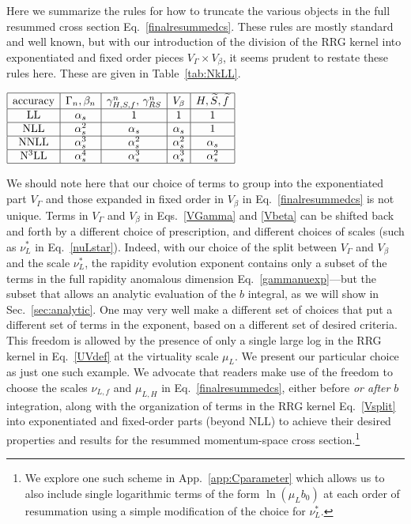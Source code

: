 \documentclass[a4,letterpaper,11pt]{article}
\newcommand{\nkll}{N$^k$LL\ }
\newcommand{\nkllprime}{N$^k$LL$'$\ }
\newcommand{\as}{\alpha_s}
\newcommand{\wt}{\widetilde}
\newcommand{\eq}[1]{Eq.~\eqref{#1}}
\newcommand{\eqs}[2]{Eqs.~\eqref{#1} and \eqref{#2}}
\renewcommand{\sec}[1]{Sec.~\ref{sec:#1}}
\newcommand{\appx}[1]{App.~\ref{app:#1}}
\newcommand{\tab}[1]{Table~\ref{tab:#1}}
\begin{document}
Here we summarize the rules for how to truncate the various objects in the full resummed cross section \eq{finalresummedcs}. These rules are mostly standard and well known, but with our introduction of the division of the RRG kernel into exponentiated and fixed order pieces $V_\Gamma \times V_\beta$, it seems prudent to restate these rules here. These are given in \tab{NkLL}.
\begin{table}[t]
\begin{center}
$
\begin{array}{ | c | c | c | c | c | c |}
\hline
\text{accuracy} & \Gamma_n,\beta_n & \gamma_{H,S,f}^n ,\, \gamma_{RS}^n & V_\beta &  H,\wt S,\wt f \\  \hline
\text{LL} & \as & 1 &  1 & 1  \\ \hline
\text{NLL} & \as^2 & \as  & \as & 1  \\ \hline
\text{NNLL} & \as^3 & \as^2  & \as^2 & \as \\ \hline
\text{N$^3$LL} & \as^4 & \as^3  & \as^3 & \as^2 \\ \hline 
\end{array}
$
\end{center}
\vspace{-1em}
\caption{Order of anomalous dimensions, beta function, and fixed-order functions (hard, soft, TMDPDF, and $V_\beta$ in \eq{VGammaVbeta}) required to achieve \nkll and \nkllprime accuracy in the resummed cross section \eq{finalresummedcs}.}
\label{tab:NkLL} 
\end{table}


We should note here that our choice of terms to group into the exponentiated part $V_\Gamma$ and those expanded in fixed order in $V_\beta$ in \eq{finalresummedcs} is not unique. Terms in $V_\Gamma$ and $V_\beta$ in \eqs{VGamma}{Vbeta} can be shifted back and forth by a different choice of prescription, and different choices of scales (such as $\nu_L^*$ in \eq{nuLstar}). Indeed, with our choice of the split between $V_\Gamma$ and $V_\beta$ and the scale $\nu_L^*$, the rapidity evolution exponent contains only a subset of the terms in the full rapidity anomalous dimension \eq{gammanuexp}---but the subset that allows an analytic evaluation of the $b$ integral, as we will show in \sec{analytic}. One may very well make a different set of choices that put a different set of terms in the exponent, based on a different set of desired criteria. This freedom is allowed by the presence of only a single large log in the RRG kernel in \eq{UVdef} at the virtuality scale $\mu_L$. 
We present our particular choice as just one such example. We advocate that readers make use of the freedom to choose the scales $\nu_{L,f}$ and $\mu_{L,H}$ in \eq{finalresummedcs}, either before \emph{or after} $b$ integration, along with the organization of terms in the RRG kernel \eq{Vsplit} into exponentiated and fixed-order parts (beyond NLL) to achieve their desired properties and results for the resummed momentum-space cross section.\footnote{We explore one such scheme in \appx{Cparameter} which allows us to also include single logarithmic terms of the form $\ln(\mu_L b_0)$ at each order of resummation using a simple modification of the choice for $\nu_L^*$.}
\end{document}
